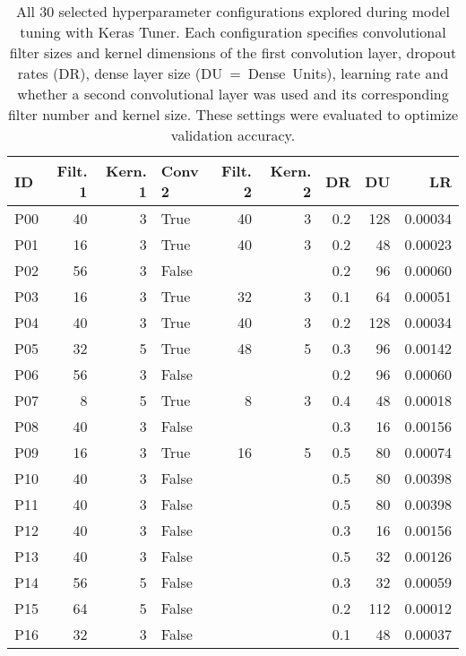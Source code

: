 \begin{table}[H]
    \centering
    \caption{All 30 selected hyperparameter configurations explored during model tuning with Keras Tuner. Each configuration specifies 
    convolutional filter sizes and kernel dimensions of the first convolution layer, dropout rates (DR), dense layer size (DU~=~Dense~Units), 
    learning rate and whether a second convolutional layer was used and its corresponding filter number and kernel size. 
    These settings were evaluated to optimize validation accuracy.}
    \label{tab:Hyperparameter_Config_tab}
    \begin{tabular}{lrrlrrrrr}
        \hline
        \textbf{ID} & \textbf{Filt. 1} & \textbf{Kern. 1} & \textbf{Conv 2} & \textbf{Filt. 2} & \textbf{Kern. 2} 
        & \textbf{DR} & \textbf{DU} & \textbf{LR} \\
        \hline
        P00 & 40 & 3 & True  & 40 & 3 & 0.2 & 128 & 0.00034 \\
        P01 & 16 & 3 & True  & 40 & 3 & 0.2 & 48  & 0.00023 \\
        P02 & 56 & 3 & False &    &   & 0.2 & 96  & 0.00060 \\
        P03 & 16 & 3 & True  & 32 & 3 & 0.1 & 64  & 0.00051 \\
        P04 & 40 & 3 & True  & 40 & 3 & 0.2 & 128 & 0.00034 \\
        P05 & 32 & 5 & True  & 48 & 5 & 0.3 & 96  & 0.00142 \\
        P06 & 56 & 3 & False &    &   & 0.2 & 96  & 0.00060 \\
        P07 & 8  & 5 & True  & 8  & 3 & 0.4 & 48  & 0.00018 \\
        P08 & 40 & 3 & False &    &   & 0.3 & 16  & 0.00156 \\
        P09 & 16 & 3 & True  & 16 & 5 & 0.5 & 80  & 0.00074 \\
        P10 & 40 & 3 & False &    &   & 0.5 & 80  & 0.00398 \\
        P11 & 40 & 3 & False &    &   & 0.5 & 80  & 0.00398 \\
        P12 & 40 & 3 & False &    &   & 0.3 & 16  & 0.00156 \\
        P13 & 40 & 3 & False &    &   & 0.5 & 32  & 0.00126 \\
        P14 & 56 & 5 & False &    &   & 0.3 & 32  & 0.00059 \\
        P15 & 64 & 5 & False &    &   & 0.2 & 112 & 0.00012 \\
        P16 & 32 & 3 & False &    &   & 0.1 & 48  & 0.00037 \\

\end{tabular}
\end{table}
